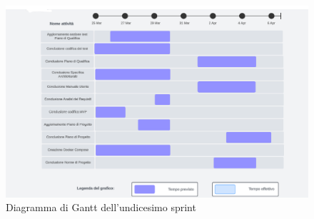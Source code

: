 \begin{figure}[h!]
    \centering
    \includegraphics[width=\textwidth]{Roadmap11sprint.png} 
    \caption{Diagramma di Gantt dell'undicesimo sprint}
    \label{fig:roadmaps11s}
\end{figure}
\newpage
